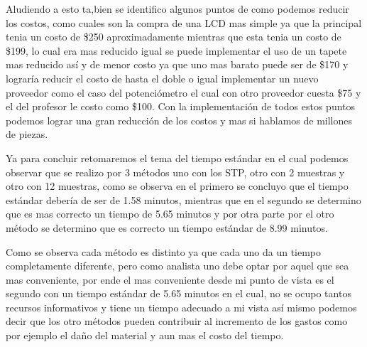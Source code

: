     Aludiendo a esto ta,bien se identifico algunos puntos de como podemos reducir los costos, como cuales son la compra de una LCD mas simple ya que la principal tenia un costo de \$250 aproximadamente mientras que esta tenia un costo de \$199, lo cual era mas reducido igual se puede implementar el uso de un tapete mas reducido así y de menor costo ya que uno mas barato puede ser de \$170 y lograría reducir el costo de hasta el doble o igual implementar un nuevo proveedor como el caso del potenciómetro el cual con otro proveedor cuesta \$75 y el del profesor le costo como \$100. Con la implementación de todos estos puntos podemos lograr una gran reducción de los costos y mas si hablamos de millones de piezas.
    
    Ya para concluir retomaremos el tema del tiempo estándar en el cual podemos observar que se realizo por 3 métodos uno con los STP, otro con 2 muestras y otro con 12 muestras, como se observa en el primero se concluyo que el tiempo estándar debería de ser de 1.58 minutos, mientras que en el segundo se determino que es mas correcto un tiempo de 5.65 minutos y por otra parte por el otro método se determino que es correcto un tiempo estándar de 8.99 minutos.  
    
    Como se observa cada método es distinto ya que cada uno da un tiempo completamente diferente, pero como analista uno debe optar por aquel que sea mas conveniente, por ende el mas conveniente desde mi punto de vista es el segundo con un tiempo estándar de 5.65 minutos en el cual, no se ocupo tantos recursos informativos y tiene un tiempo adecuado a mi vista así mismo podemos decir que los otro métodos pueden contribuir al incremento de los gastos como por ejemplo el daño del material y aun mas el costo del tiempo.
    
    
    
    
    
    
    
    
    
    \appendix
    \label{Figura:instructivo}
    
    \label{Figura:Materiales}
    
    \label{Figura: DigBim}
    
    
    \newpage
    
    